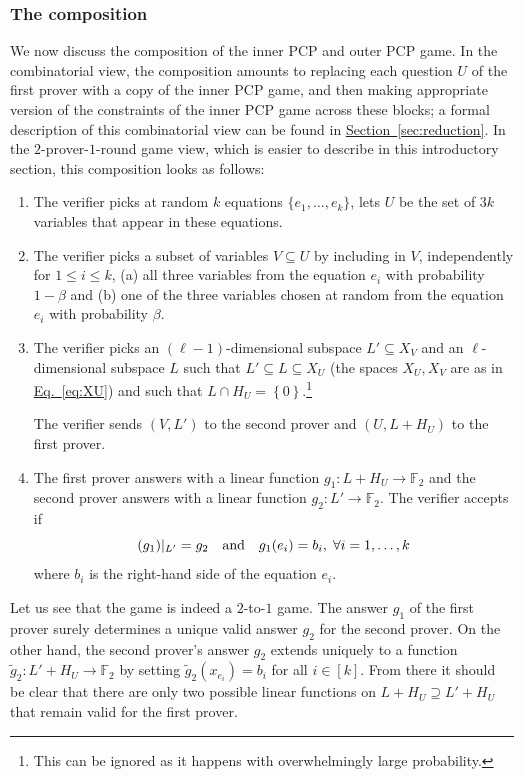 \documentclass[11pt]{article}
\numberwithin{equation}{section}
\theoremstyle{definition}
\theoremstyle{plain}
\newcommand{\expref}[2]{\hyperref[#2]{#1~\ref{#2}}}
\newcommand{\expeqref}[2]{\hyperref[#2]{#1~\eqref{#2}}}
\newcommand\set[1]{{\left\{ #1 \right\}}}
\renewcommand\leq{\leqslant}
\renewcommand\subset{\subseteq}
\renewcommand\supset{\supseteq}
\def\F{\mathbb{F}}
\begin{document}
\subsubsection{The composition}
\def\F{\mathbb{F}}
We now discuss the composition of the inner PCP and outer PCP game. In the combinatorial view, the composition amounts to
replacing each question $U$ of the first prover with a copy of the inner PCP game, and then making appropriate version of
the constraints of the inner PCP game across these blocks; a formal description of this combinatorial view can be found
in \expref{Section}{sec:reduction}. In the $2$-prover-$1$-round game view, which is easier to describe in this introductory section,
this composition looks as follows:
\begin{enumerate}
\item The verifier picks at random $k$ equations $\{e_1,\ldots, e_k \}$, lets $U$ be the set of $3k$ variables that appear in these equations.
%
\item The verifier picks a subset of variables $V \subseteq U$ by including in $V$, independently for $1 \leq i \leq k$,
     (a) all three variables from the equation $e_i$  with probability $1-\beta$ and (b)
      one of the three
      variables chosen at random from the equation $e_i$ with probability $\beta$.

\item The verifier picks an $(\ell-1)$-dimensional subspace $L'
  \subset X_V$ and an $\ell$-dimensional subspace $L$ such that
  $L'\subset L \subset X_U$ (the spaces $X_U,X_V$ are as in
\expeqref{Eq.}{eq:XU})  %
 and such that $L\cap H_U=\set 0$.\footnote{This can be
    ignored as it happens with overwhelmingly large probability.}

The verifier sends $(V,L')$ to the second prover and $(U,L + H_U)$ to the first prover.

\item\label{item:2} The first prover answers with a linear function $g_1:L+H_U \to \F_2$ and the second prover answers with a linear function $g_2:L'\to\F_2$.
    The verifier accepts if \[ (g_1)|_{L'} = g_2 \quad\hbox{and}\quad
 g_1(e_i)=b_i,\;\forall i=1,\ldots,k\]
    where $b_i$ is the right-hand side of the equation $e_i$.
\end{enumerate}

Let us see that the game is indeed a $2$-to-$1$ game. The answer $g_1$ of the first prover surely determines a unique valid answer  $g_2$ for the second prover. On the other hand, the second prover's answer $g_2$ extends uniquely to a function $\tilde g_2:L'+H_U\to\F_2$ by setting $\tilde g_2(x_{e_i})=b_i $ for all $i\in[k]$. From there it should be clear that there are only two possible linear functions on $L+H_U \supset L'+H_U$ that remain valid for the first prover.
\end{document}
